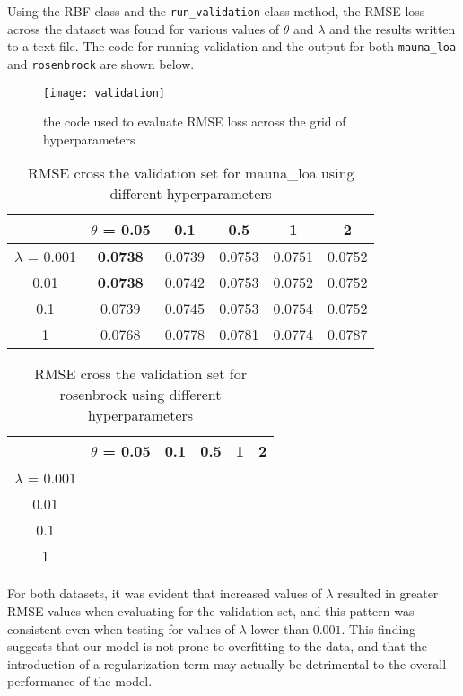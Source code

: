 \documentclass{article}
\begin{document}
Using the RBF class and the \verb+run_validation+ class method, the RMSE loss across the dataset was found for various values of $\theta$ and $\lambda$ and the results written to a text file. The code for running validation and the output for both \verb+mauna_loa+ and \verb+rosenbrock+ are shown below.

\begin{figure}[H]
\centering
\texttt{[image: validation]}
\caption{the code used to evaluate RMSE loss across the grid of hyperparameters}
\end{figure}


\begin{table}
\begin{center}
\begin{tabular}{|c|c|c|c|c|c|}
\hline
 & $\theta$ = 0.05 & 0.1 & 0.5 & 1 & 2 \\ \hline
 $\lambda$ = 0.001  & \textbf{0.0738} & 0.0739 & 0.0753 & 0.0751 & 0.0752\\ \hline
 0.01 & \textbf{0.0738} & 0.0742 & 0.0753 & 0.0752 & 0.0752\\ \hline
 0.1 & 0.0739 & 0.0745 & 0.0753 & 0.0754 & 0.0752\\ \hline
 1 & 0.0768 & 0.0778 & 0.0781 & 0.0774 & 0.0787\\
 \hline
\end{tabular}
\caption{RMSE cross the validation set for mauna\_loa using different hyperparameters}
\end{center}
\end{table}

\begin{table}
\begin{center}
\begin{tabular}{|c|c|c|c|c|c|}
\hline
 & $\theta$ = 0.05 & 0.1 & 0.5 & 1 & 2 \\ \hline
 $\lambda$ = 0.001  & \\ \hline
 0.01 &\\ \hline
 0.1 & \\ \hline
 1 & \\
 \hline
\end{tabular}
\caption{RMSE cross the validation set for rosenbrock using different hyperparameters}
\end{center}
\end{table}


For both datasets, it was evident that increased values of $\lambda$ resulted in greater RMSE values when evaluating for the validation set, and this pattern was consistent even when testing for values of $\lambda$ lower than $0.001$. This finding suggests that our model is not prone to overfitting to the data, and that the introduction of a regularization term may actually be detrimental to the overall performance of the model.
\end{document}
